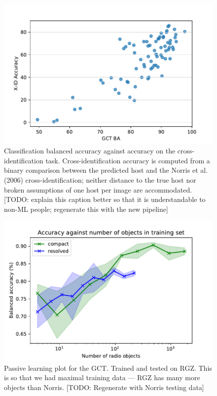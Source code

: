 \documentclass[fleqn,usenatbib,usedcolumn]{mnras}
\begin{document}
  \begin{figure}
  \centering
  \includegraphics[width=\columnwidth]{gct-to-xid.pdf}
  \caption{Classification balanced accuracy against accuracy on the
  cross-identification task. Cross-identification accuracy is computed
  from a binary comparison between the predicted host and the Norris et
  al. (2006) cross-identification; neither distance to the true host nor
  broken assumptions of one host per image are accommodated. {[}TODO:
  explain this caption better so that it is understandable to non-ML
  people; regenerate this with the new pipeline{]}\label{fig:gct-to-xid}}
  \end{figure}


  \begin{figure}
  \centering
  \includegraphics[width=\columnwidth]{passive.pdf}
  \caption{Passive learning plot for the GCT. Trained and tested on RGZ.
    This is so that we had maximal training data --- RGZ has many more
    objects than Norris. [TODO: Regenerate with Norris testing data]
    \label{fig:passive}}
  \end{figure}
\end{document}
